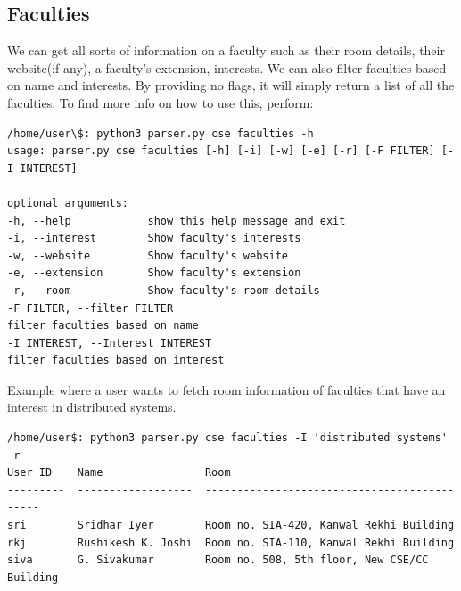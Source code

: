\documentclass[12pt, letterpaper, twoside]{article}
\begin{document}
\subsection{Faculties}
We can get all sorts of information on a faculty such as their room details, their website(if any),
a faculty's extension, interests. We can also filter faculties based on name
and interests. By providing no flags, it will simply return a list of all the faculties.
To find more info on how to use this, perform:
\begin{verbatim}
/home/user\$: python3 parser.py cse faculties -h
usage: parser.py cse faculties [-h] [-i] [-w] [-e] [-r] [-F FILTER] [-I INTEREST]

optional arguments:
-h, --help            show this help message and exit
-i, --interest        Show faculty's interests
-w, --website         Show faculty's website
-e, --extension       Show faculty's extension
-r, --room            Show faculty's room details
-F FILTER, --filter FILTER
filter faculties based on name
-I INTEREST, --Interest INTEREST
filter faculties based on interest
\end{verbatim}
Example where a user wants to fetch room information of faculties that 
have an interest in distributed systems. 
\begin{verbatim}
/home/user$: python3 parser.py cse faculties -I 'distributed systems' -r
User ID    Name                Room                                          
---------  ------------------  --------------------------------------------  
sri        Sridhar Iyer        Room no. SIA-420, Kanwal Rekhi Building       
rkj        Rushikesh K. Joshi  Room no. SIA-110, Kanwal Rekhi Building 
siva       G. Sivakumar        Room no. 508, 5th floor, New CSE/CC Building 
\end{verbatim}
\end{document}
